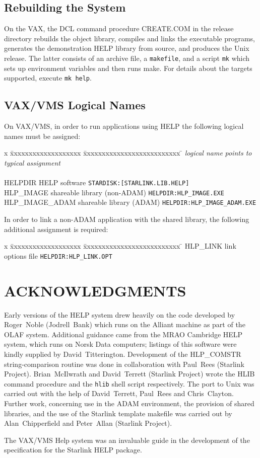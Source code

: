 \subsection{Rebuilding the System}
On the VAX, the DCL command procedure CREATE.COM in the release
directory rebuilds the object
library, compiles and links the executable programs, generates
the demonstration HELP library from source, and produces the
Unix release.  The latter consists of an archive file, a \verb|makefile|,
and a script \verb|mk| which sets up environment variables and
then runs make.  For details about the targets supported, execute
\verb|mk help|.

\subsection{VAX/VMS Logical Names}
On VAX/VMS, in order to run applications using HELP the following
logical names must be assigned:
\begin{tabbing}
x \= xxxxxxxxxxxxxxxxxxx \=  xxxxxxxxxxxxxxxxxxxxxxxxxx \= \kill
\> {\it logical name} \> {\it points to} \> {\it typical assignment} \\ \\
\> HELPDIR \> HELP software \> \verb|STARDISK:[STARLINK.LIB.HELP]| \\
\> HLP\_IMAGE \> shareable library (non-ADAM) \>
                                 \verb|HELPDIR:HLP_IMAGE.EXE| \\
\> HLP\_IMAGE\_ADAM \> shareable library (ADAM) \>
                                 \verb|HELPDIR:HLP_IMAGE_ADAM.EXE|
\end{tabbing}

In order to link a non-ADAM application with the shared library, the
following additional assignment is required:
\begin{tabbing}
x \= xxxxxxxxxxxxxxxxxxx \=  xxxxxxxxxxxxxxxxxxxxxxxxxx \= \kill
\> HLP\_LINK \> link options file \> \verb|HELPDIR:HLP_LINK.OPT|
\end{tabbing}

\section{ACKNOWLEDGMENTS}
Early versions of the HELP system drew heavily on the code developed by
Roger~Noble (Jodrell~Bank) which runs on the Alliant machine as part of
the OLAF system.  Additional guidance came from the MRAO Cambridge HELP
system, which runs on Norsk Data computers;  listings of this software
were kindly supplied by David~Titterington.  Development of the
HLP\_COMSTR string-comparison routine was done in collaboration with
Paul~Rees (Starlink Project).  Brian~McIlwrath and David~Terrett
(Starlink Project) wrote the HLIB command procedure and the \verb|hlib|
shell script respectively.  The port to Unix was carried out
with the help of David~Terrett, Paul~Rees and Chris~Clayton.  Further
work, concerning use in the ADAM environment, the provision
of shared libraries, and the use of the Starlink template makefile
was carried out by Alan~Chipperfield and Peter~Allan (Starlink
Project).

The VAX/VMS Help system was an invaluable guide in the development of
the specification for the Starlink HELP package.


